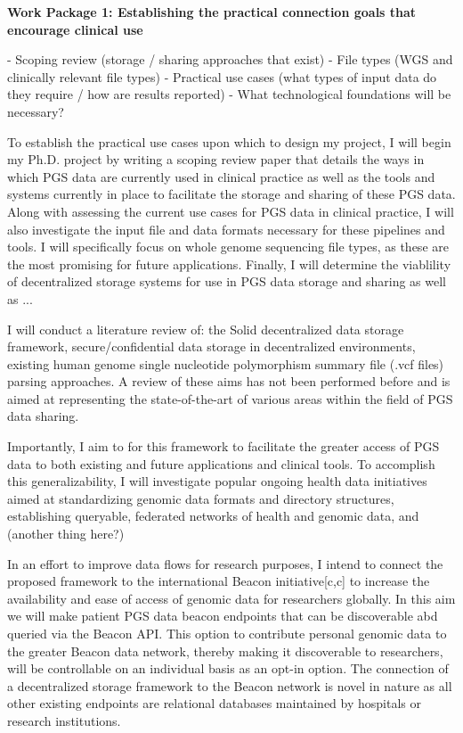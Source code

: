 \documentclass{article}
\begin{document}
\textbf{Work Package 1: Establishing the practical connection goals that encourage clinical use}

- Scoping review (storage / sharing approaches that exist)
- File types (WGS and clinically relevant file types)
- Practical use cases (what types of input data do they require / how are results reported)
- What technological foundations will be necessary?

To establish the practical use cases upon which to design my project, I will begin my Ph.D. project by writing a scoping review paper that details the ways in which PGS data are currently used in clinical practice as well as the tools and systems currently in place to facilitate the storage and sharing of these PGS data. 
Along with assessing the current use cases for PGS data in clinical practice, I will also investigate the input file and data formats necessary for these pipelines and tools. I will specifically focus on whole genome sequencing file types, as these are the most promising for future applications. 
Finally, I will determine the viablility of decentralized storage systems for use in PGS data storage and sharing as well as ...

I will conduct a literature review of: the Solid decentralized data storage framework, secure/confidential data storage in decentralized environments, existing human genome single nucleotide polymorphism summary file (.vcf files) parsing approaches. A review of these aims has not been performed before and is aimed at representing the state-of-the-art of various areas within the field of PGS data sharing.

Importantly, I aim to for this framework to facilitate the greater access of PGS data to both existing and future applications and clinical tools. 
To accomplish this generalizability, I will investigate popular ongoing health data initiatives aimed at standardizing genomic data formats and directory structures, establishing queryable, federated networks of health and genomic data, and (another thing here?)

In an effort to improve data flows for research purposes, I intend to connect the proposed framework to the international Beacon initiative[c,c] to increase the availability and ease of access of genomic data for researchers globally. 
In this aim we will make patient PGS data beacon endpoints that can be discoverable abd queried via the Beacon API.
This option to contribute personal genomic data to the greater Beacon data network, thereby making it discoverable to researchers, will be controllable on an individual basis as an opt-in option. 
The connection of a decentralized storage framework to the Beacon network is novel in nature as all other existing endpoints are relational databases maintained by hospitals or research institutions.
\end{document}
